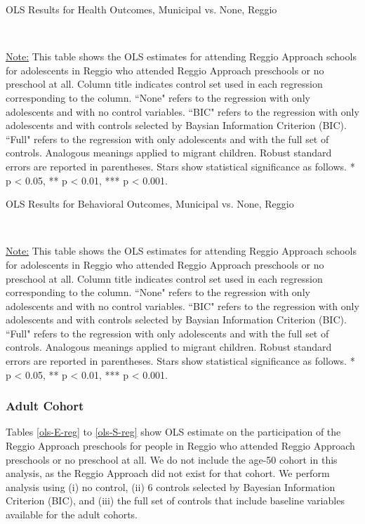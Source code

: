 \begin{table}[H] \caption{OLS Results for Health Outcomes, Municipal vs. None, Reggio} \label{ols-H-adol-reg}

\vspace{1ex} \\
\footnotesize\raggedright{\underline{Note:} This table shows the OLS estimates for attending Reggio Approach schools for adolescents in Reggio who attended Reggio Approach preschools or no preschool at all. Column title indicates control set used in each regression corresponding to the column. ``None" refers to the regression with only adolescents and with no control variables. ``BIC" refers to the regression with only adolescents and with controls selected by Baysian Information Criterion (BIC). ``Full" refers to the regression with only adolescents and with the full set of controls. Analogous meanings applied to migrant children. Robust standard errors are reported in parentheses. Stars show statistical significance as follows. * p < 0.05, ** p < 0.01, *** p < 0.001.}
\end{table}

\begin{table}[H] \caption{OLS Results for Behavioral Outcomes, Municipal vs. None, Reggio} \label{ols-B-adol-reg}

\vspace{1ex} \\
\footnotesize\raggedright{\underline{Note:} This table shows the OLS estimates for attending Reggio Approach schools for adolescents in Reggio who attended Reggio Approach preschools or no preschool at all. Column title indicates control set used in each regression corresponding to the column. ``None" refers to the regression with only adolescents and with no control variables. ``BIC" refers to the regression with only adolescents and with controls selected by Baysian Information Criterion (BIC). ``Full" refers to the regression with only adolescents and with the full set of controls. Analogous meanings applied to migrant children. Robust standard errors are reported in parentheses. Stars show statistical significance as follows. * p < 0.05, ** p < 0.01, *** p < 0.001.}
\end{table}

\subsubsection{Adult Cohort}
Tables \ref{ols-E-reg} to \ref{ols-S-reg} show OLS estimate on the participation of the Reggio Approach preschools for people in Reggio who attended Reggio Approach preschools or no preschool at all. We do not include the age-50 cohort in this analysis, as the Reggio Approach did not exist for that cohort. We perform analysis using (i) no control, (ii) 6 controls selected by Bayesian Information Criterion (BIC), and (iii) the full set of controls that include baseline variables available for the adult cohorts. 

